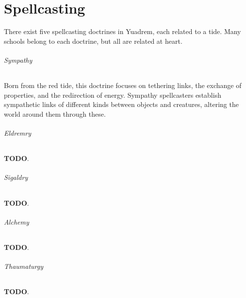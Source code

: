 \chapter{Spellcasting} \label{ch::spellcasting}
There exist five spellcasting doctrines in Yuadrem, each related to a tide.
Many schools belong to each doctrine, but all are related at heart.

\subparagraph{Sympathy} %
    Born from the red tide, this doctrine focuses on tethering links, the exchange of properties, and the redirection of energy.
    Sympathy spellcasters establish sympathetic links of different kinds between objects and creatures, altering the world around them through these.

\subparagraph{Eldremry} %
    \textbf{TODO}.

\subparagraph{Sigaldry} %
    \textbf{TODO}.

\subparagraph{Alchemy} %
    \textbf{TODO}.

\subparagraph{Thaumaturgy} %
    \textbf{TODO}.


